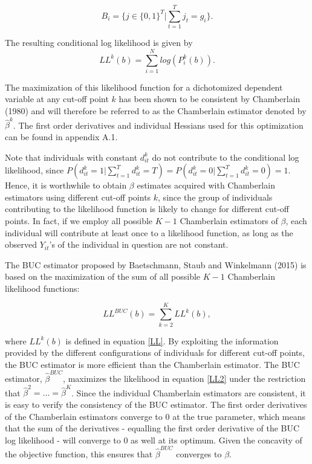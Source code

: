 \documentclass[12pt]{article}
\begin{document}
\[
    B_{i} = \Bigg\{ j \in \{0,1\}^T | \sum_{t=1}^{T}{j_{t}}=g_{i} \Bigg\}.
\]

The resulting conditional log likelihood is given by 
\begin{equation}
    LL^k(b) = \sum_{i = 1}^{N} log(P_{i}^k(b)).
    \label{LL}
\end{equation}

\noindent The maximization of this likelihood function for a dichotomized dependent variable at any cut-off point $k$ has been shown to be consistent by Chamberlain (1980) and will therefore be referred to as the Chamberlain estimator denoted by $\hat{\beta}^k$. The first order derivatives and individual Hessians used for this optimization can be found in appendix A.1. 

Note that individuals with constant $d_{it}^k$ do not contribute to the conditional log likelihood, since $P(d_{it}^k=1|\sum_{t=1}^{T}{d_{it}^k}=T) = P(d_{it}^k=0|\sum_{t=1}^{T}{d_{it}^k}=0)=1$. Hence, it is worthwhile to obtain $\beta$ estimates acquired with Chamberlain estimators using different cut-off points $k$, since the group of individuals contributing to the likelihood function is likely to change for different cut-off points. In fact, if we employ all possible $K-1$ Chamberlain estimators of $\beta$, each individual will contribute at least once to a likelihood function, as long as the observed $Y_{it}$'s of the individual in question are not constant.

The BUC estimator proposed by Baetschmann, Staub and Winkelmann (2015) is based on the maximization of the sum of all possible $K-1$ Chamberlain likelihood functions:

\begin{equation}
    LL^{BUC}(b) = \sum_{k=2}^{K}{LL^k(b)}, 
    \label{LL2}
\end{equation}

where $LL^k(b)$ is defined in equation \ref{LL}. By exploiting the information provided by the different configurations of individuals for different cut-off points, the BUC estimator is more efficient than the Chamberlain estimator. The BUC estimator, $\hat{\beta}^{BUC}$, maximizes the likelihood in equation \ref{LL2} under the restriction that $\hat{\beta}^2=\ldots=\hat{\beta}^K$. Since the individual Chamberlain estimators are consistent, it is easy to verify the consistency of the BUC estimator. The first order derivatives of the Chamberlain estimators converge to 0 at the true parameter, which means that the sum of the derivatives - equalling the first order derivative of the BUC log likelihood - will converge to 0 as well at its optimum. Given the concavity of the objective function, this ensures that $\hat{\beta}^{BUC}$ converges to $\beta$.
\end{document}
